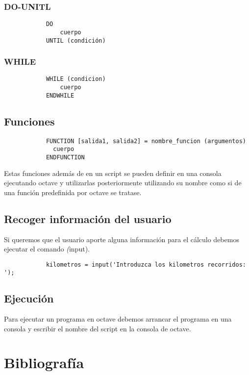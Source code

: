 \documentclass[a4,12pt,graphicx,caption,rotating]{article}
\begin{document}
\subsubsection{DO-UNITL}
\begin{verbatim}
            DO
                cuerpo
            UNTIL (condición)
\end{verbatim}
\subsubsection{WHILE}
\begin{verbatim}
            WHILE (condicion)
                cuerpo
            ENDWHILE
\end{verbatim}
\subsection{Funciones}
\begin{verbatim}
            FUNCTION [salida1, salida2] = nombre_funcion (argumentos)
              cuerpo
            ENDFUNCTION
\end{verbatim}

Estas funciones además de en un script se pueden definir en una consola ejecutando octave y utilizarlas posteriormente utilizando su nombre como si de una función predefinida por octave se tratase.
\subsection{Recoger información del usuario}
Si queremos que el usuario aporte alguna información para el cálculo debemos ejecutar el comando \emph(input).
\begin{verbatim}
            kilometros = input('Introduzca los kilometros recorridos: ');
\end{verbatim}
\subsection{Ejecución}
Para ejecutar un programa en octave debemos arrancar el programa en una consola y escribir el nombre del script en la consola de octave.
\section{Bibliografía}
\end{document}
